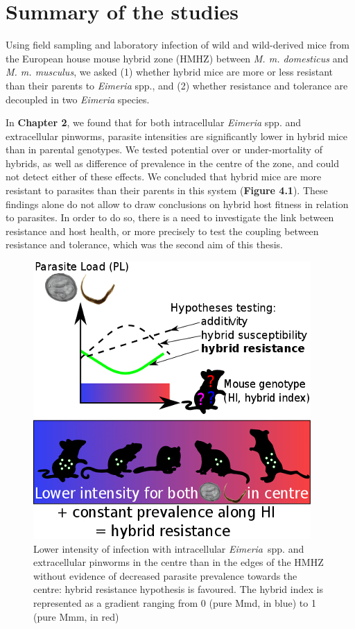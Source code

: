 \section{Summary of the studies}
Using field sampling and laboratory infection of wild and wild-derived mice from the European house mouse hybrid zone (HMHZ) between \textit{M. m. domesticus} and \textit{M. m. musculus}, we asked (1) whether hybrid mice are more or less resistant than their parents to \textit{Eimeria} spp., and (2) whether resistance and tolerance are decoupled in two \textit{Eimeria} species. 
\par
In \textbf{Chapter 2}, we found that for both intracellular \textit{Eimeria} spp. and extracellular pinworms, parasite intensities are significantly lower in hybrid mice than in parental genotypes. We tested potential over or under-mortality of hybrids, as well as difference of prevalence in the centre of the zone, and could not detect either of these effects. We concluded that hybrid mice are more resistant to parasites than their parents in this system (\textbf{Figure 4.1}). These findings alone do not allow to draw conclusions on hybrid host fitness in relation to parasites. In order to do so, there is a need to investigate the link between resistance and host health, or more precisely to test the coupling between resistance and tolerance, which was the second aim of this thesis.

\begin{figure}[H]
    \centering
    \includegraphics[width=.5\linewidth,height=\textheight,keepaspectratio]{images/4discussion/Figure3.jpg}
    \caption{Lower intensity of infection with intracellular \textit{Eimeria}~spp. and extracellular pinworms in the centre than in the edges of the HMHZ without evidence of decreased parasite prevalence towards the centre: hybrid resistance hypothesis is favoured. The hybrid index is represented as a gradient ranging from 0 (pure Mmd, in blue) to 1 (pure Mmm, in red)}
\end{figure}

